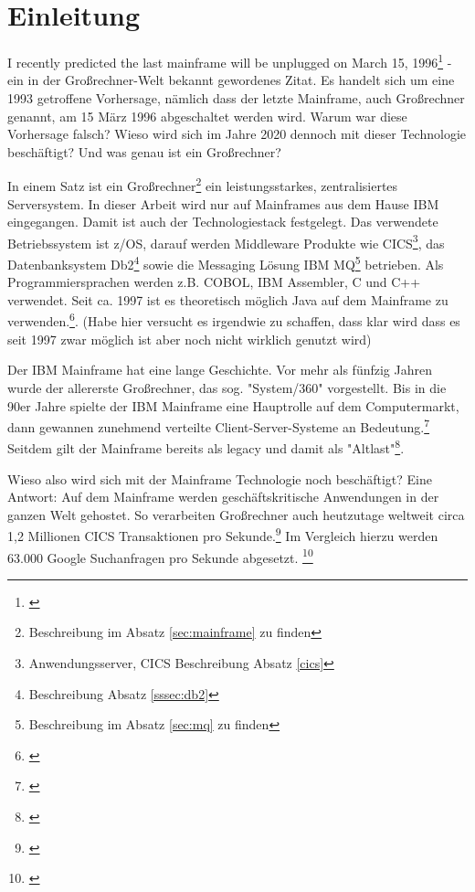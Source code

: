 \chapter{Einleitung}\label{ch:einleitung}
\glqq I recently predicted the last mainframe will be unplugged on March 15, 1996\grqq\footnote{\cite{Alsop.1993}} - ein in der Großrechner-Welt bekannt gewordenes Zitat.
Es handelt sich um eine 1993 getroffene Vorhersage, nämlich dass der letzte Mainframe, auch Großrechner genannt, am 15 März 1996 abgeschaltet werden wird.
Warum war diese Vorhersage falsch? 
Wieso wird sich im Jahre 2020 dennoch mit dieser Technologie beschäftigt? 
Und was genau ist ein Großrechner?

In einem Satz ist ein Großrechner\footnote{Beschreibung im Absatz \ref{sec:mainframe} zu finden} ein leistungsstarkes, zentralisiertes Serversystem.
In dieser Arbeit wird nur auf Mainframes aus dem Hause IBM eingegangen.
Damit ist auch der Technologiestack festgelegt.
Das verwendete Betriebssystem ist z/OS, darauf werden Middleware Produkte wie CICS\footnote{Anwendungsserver, CICS Beschreibung Absatz \ref{cics}}, das Datenbanksystem Db2\footnote{ Beschreibung Absatz \ref{sssec:db2}} sowie die Messaging Lösung \glqq IBM MQ\grqq{}\footnote{Beschreibung im Absatz \ref{sec:mq} zu finden} betrieben.
Als Programmiersprachen werden z.B. COBOL, IBM Assembler, C und C++ verwendet.
Seit ca. 1997 ist es theoretisch möglich Java auf dem Mainframe zu verwenden.\footnote{\cite{Steegmans.2003}}. (Habe hier versucht es irgendwie zu schaffen, dass klar wird dass es seit 1997 zwar möglich ist aber noch nicht wirklich genutzt wird)

Der IBM Mainframe hat eine lange Geschichte.
Vor mehr als fünfzig Jahren wurde der allererste Großrechner, das sog. "System/360" vorgestellt.
Bis in die 90er Jahre spielte der IBM Mainframe eine Hauptrolle auf dem Computermarkt, dann gewannen zunehmend verteilte Client-Server-Systeme an Bedeutung.\footnote{\cite{Ceruzzi.2003}}
Seitdem gilt der Mainframe bereits als \glqq  legacy\grqq{} und damit als "Altlast"\footnote{\cite{legacy.22.2.2020}}.

Wieso also wird sich mit der Mainframe Technologie noch beschäftigt? Eine Antwort: Auf dem Mainframe werden geschäftskritische Anwendungen in der ganzen Welt gehostet.
So verarbeiten Großrechner auch heutzutage weltweit circa 1,2 Millionen CICS Transaktionen pro Sekunde.\footnote{\cite{IBM.2019}}
Im Vergleich hierzu werden 63.000 Google Suchanfragen pro Sekunde abgesetzt. \footnote{\cite{Sullivan.2016}}


